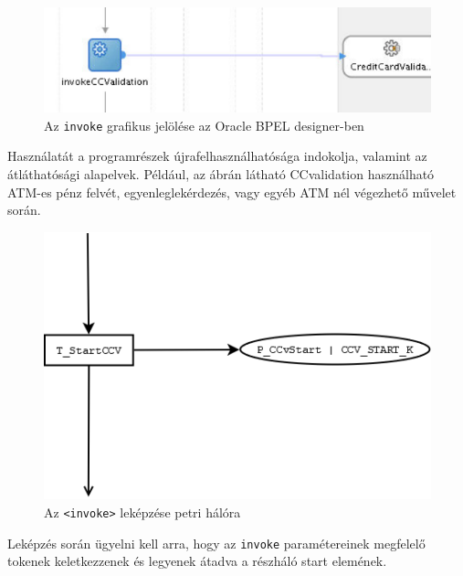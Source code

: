 \begin{figure}[h!]
\centering
\includegraphics[scale=0.6]{images/invoke.png}
\caption{Az \texttt{invoke} grafikus jelölése az Oracle BPEL designer-ben}
\label{fig:invoke}
\end{figure}

Használatát a programrészek újrafelhasználhatósága indokolja, valamint az átláthatósági alapelvek. Például, az ábrán látható CCvalidation használható ATM-es pénz felvét, egyenleglekérdezés, vagy egyéb ATM nél végezhető művelet során. 

\begin{figure}[h!]
\centering
\includegraphics[scale=0.4]{images/invokenet.png}
\caption{Az \texttt{<invoke>} leképzése petri hálóra}
\label{fig:invokenet}
\end{figure}
Leképzés során ügyelni kell arra, hogy az \texttt{invoke} paramétereinek megfelelő tokenek keletkezzenek és legyenek átadva a részháló start elemének.


